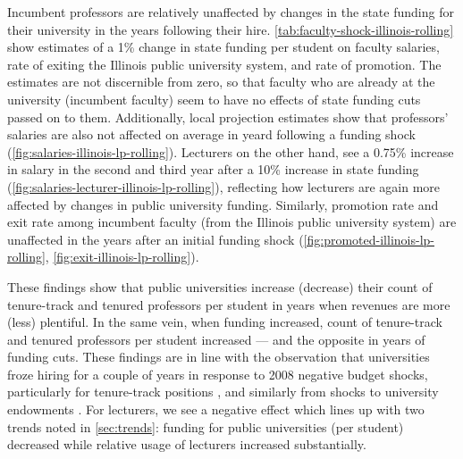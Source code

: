 Incumbent professors are relatively unaffected by changes in the state funding for their university in the years following their hire.
\autoref{tab:faculty-shock-illinois-rolling} show estimates of a 1\% change in state funding per student on faculty salaries, rate of exiting the Illinois public university system, and rate of promotion.
The estimates are not discernible from zero, so that faculty who are already at the university (incumbent faculty) seem to have no effects of state funding cuts passed on to them.
Additionally, local projection estimates show that professors' salaries are also not affected on average in yeard following a funding shock  (\autoref{fig:salaries-illinois-lp-rolling}).
Lecturers on the other hand, see a 0.75\% increase in salary in the second and third year after a 10\% increase in state funding (\autoref{fig:salaries-lecturer-illinois-lp-rolling}), reflecting how lecturers are again more affected by changes in public university funding.
Similarly, promotion rate and exit rate among incumbent faculty  (from the Illinois public university system) are unaffected in the years after an initial funding shock (\autoref{fig:promoted-illinois-lp-rolling}, \ref{fig:exit-illinois-lp-rolling}).

These findings show that public universities increase (decrease) their count of tenure-track and tenured professors per student in years when revenues are more (less) plentiful.
In the same vein, when funding increased, count of tenure-track and tenured professors per student increased --- and the opposite in years of funding cuts.
These findings are in line with the observation that universities froze hiring for a couple of years in response to 2008 negative budget shocks, particularly for tenure-track positions \citep{turner2014impact}, and similarly from shocks to university endowments \citep{brown2014endowment}.
For lecturers, we see a negative effect which lines up with two trends noted in \autoref{sec:trends}: funding for public universities (per student) decreased while relative usage of lecturers increased substantially.

